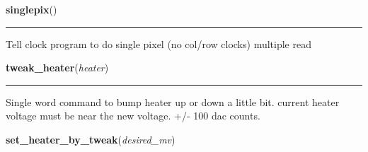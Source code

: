     \label{dsp:singlepix}

    \vspace{0.5ex}

    \begin{boxedminipage}{\textwidth}

    \raggedright \textbf{singlepix}()

    \vspace{-1.5ex}

    \rule{\textwidth}{0.5\fboxrule}
    Tell clock program to do single pixel (no col/row clocks) multiple read

    \vspace{1ex}

    \end{boxedminipage}

    \label{dsp:tweak_heater}

    \vspace{0.5ex}

    \begin{boxedminipage}{\textwidth}

    \raggedright \textbf{tweak\_heater}(\textit{heater})

    \vspace{-1.5ex}

    \rule{\textwidth}{0.5\fboxrule}
    Single word command to bump heater up or down a little bit. current 
    heater voltage must be near the new voltage. +/- 100 dac counts.

    \vspace{1ex}

    \end{boxedminipage}

    \label{dsp:set_heater_by_tweak}

    \vspace{0.5ex}

    \begin{boxedminipage}{\textwidth}

    \raggedright \textbf{set\_heater\_by\_tweak}(\textit{desired\_mv})

    \end{boxedminipage}

    \label{dsp:adc2diode}

